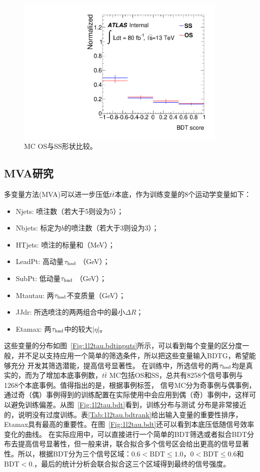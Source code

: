 \begin{figure}[htp]
\begin{minipage}[t]{0.33\linewidth}
\end{minipage}
\begin{minipage}[t]{0.33\linewidth}
\centering
\includegraphics[width=0.9\textwidth,angle=-90]{fig/OSvsSS_all/MVA1l2tau_weight_F.pdf}
\end{minipage}
\caption{MC OS与SS形状比较。}
\label{fig:OSvsSS_MC}
\end{figure}

\clearpage
\subsection{MVA研究}
多变量方法(MVA)可以进一步压低$t\bar{t}$本底，作为训练变量的8个运动学变量如下：
\begin{itemize}
 \item Njets: 喷注数（若大于5则设为5）；
 \item Nbjets: 标定为$b$的喷注数（若大于3则设为3）；
 \item HTjets: 喷注\pt 的标量和（MeV）；
 \item LeadPt: 高动量$\tau_{\text{had}}$ \pt （GeV）；
 \item SubPt: 低动量$\tau_{\text{had}}$ \pt （GeV）；
 \item Mtautau: 两$\tau_{\text{had}}$不变质量（GeV）；
 \item JJdr: 所选喷注的两两组合中的最小$\Delta R$；
 \item Etamax: 两$\tau_{\text{had}}$中的较大$|\eta|$。
\end{itemize}
这些变量的分布如图~\ref{Fig:1l2tau.bdtinputs}所示，可以看到每个变量的区分度一般，并不足以支持应用一个简单的筛选条件，所以把这些变量输入BDTG，希望能够充分
开发其筛选潜能，提高信号显著性。
在训练中，所选信号的两$\tau_{\text{had}}$均是真实的，而为了增加本底事例数，$t\bar{t}$ MC包括OS和SS，总共有8258个信号事例与1268个本底事例。值得指出的是，根据事例标签，
信号MC分为奇事例与偶事例，通过奇（偶）事例得到的训练配置在实际使用中会应用到偶（奇）事例中，这样可以避免训练偏差。从图~\ref{Fig:1l2tau.bdt}看到，训练分布与测试
分布是非常接近的，说明没有过度训练。表\ref{Tab:1l2tau.bdtrank}给出输入变量的重要性排序，Etamax具有最高的重要性。在图~\ref{Fig:1l2tau.bdt}还可以看到本底压低随信号效率变化的曲线。
在实际应用中，可以直接进行一个简单的BDT筛选或者拟合BDT分布去提高信号显著性，但一般来讲，联合拟合多个信号区会给出更高的信号显著性。所以，根据BDT分为三个信号区域：$0.6<\text{BDT}\le 1.0$，$0<\text{BDT}\le 0.6$和$\text{BDT}<0.$，最后的统计分析会联合拟合这三个区域得到最终的信号强度。

